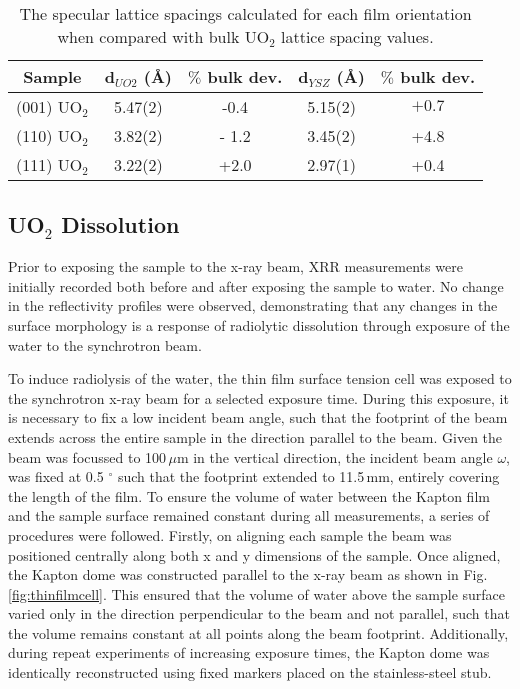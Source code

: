 \documentclass[twocolumn,prl,nobalancelastpage,aps,10pt]{revtex4-1}
\begin{document}
\begin{table}[!h]
\centering %
{\renewcommand{\arraystretch}{1.5}
\begin{tabular}{c c c c c} %
\hline \hline %
    Sample & d$_{UO2}$ (\AA) & $\%$ bulk dev. & d$_{YSZ}$ (\AA) & $\%$ bulk dev. \\ [0.5ex] %
\hline %
(001) UO$_2$ & 5.47(2) & -0.4   & 5.15(2) & $+0.7$ \\ %
(110) UO$_2$ & 3.82(2) & - 1.2  & 3.45(2) & +4.8   \\ %
(111) UO$_2$ & 3.22(2) & +2.0 & 2.97(1)  &  +0.4 \\ %
\hline %
\end{tabular}}
\caption{The specular lattice spacings calculated for each film orientation when compared with bulk UO$_2$ lattice spacing values.} %
\label{tab:offspecpars}
\end{table}

\subsection{UO$_2$ Dissolution}

Prior to exposing the sample to the x-ray beam, XRR measurements were initially recorded both before and after exposing the sample to water. No change in the reflectivity profiles were observed, demonstrating that any changes in the surface morphology is a response of radiolytic dissolution through exposure of the water to the synchrotron beam.

To induce radiolysis of the water, the thin film surface tension cell was exposed to the synchrotron x-ray beam for a selected exposure time. During this exposure, it is necessary to fix a low incident beam angle, such that the footprint of the beam extends across the entire sample in the direction parallel to the beam. Given the beam was focussed to 100\,$\mu$m  in the vertical direction, the incident beam angle $\omega$, was fixed at 0.5 $^{\circ}$ such that the footprint extended to 11.5\,mm, entirely covering the length of the film. To ensure the volume of water between the Kapton film and the sample surface remained constant during all measurements, a series of procedures were followed. Firstly, on aligning each sample the beam was positioned centrally along both x and y dimensions of the sample. Once aligned, the Kapton dome was constructed parallel to the x-ray beam as shown in Fig. \ref{fig:thinfilmcell}. This ensured that the volume of water above the sample surface varied only in the direction perpendicular to the beam and not parallel, such that the volume remains constant at all points along the beam footprint. Additionally, during repeat experiments of increasing exposure times, the Kapton dome was identically reconstructed using fixed markers placed on the stainless-steel stub.
\end{document}
